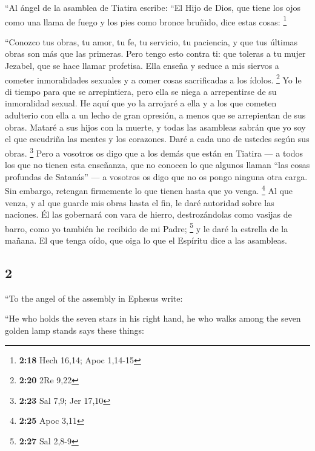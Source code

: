 \begin{paracol}{2}
 ``Al ángel de la asamblea de Tiatira escribe: ``El Hijo
de Dios, que tiene los ojos como una llama de fuego y los pies como
bronce bruñido, dice estas cosas: \footnote{\textbf{2:18} Hech 16,14;
  Apoc 1,14-15}

 ``Conozco tus obras, tu amor, tu fe, tu servicio, tu
paciencia, y que tus últimas obras son más que las primeras.
 Pero tengo esto contra ti: que toleras a tu mujer
Jezabel, que se hace llamar profetisa. Ella enseña y seduce a mis
siervos a cometer inmoralidades sexuales y a comer cosas sacrificadas a
los ídolos. \footnote{\textbf{2:20} 2Re 9,22}  Yo le di
tiempo para que se arrepintiera, pero ella se niega a arrepentirse de su
inmoralidad sexual.  He aquí que yo la arrojaré a ella y
a los que cometen adulterio con ella a un lecho de gran opresión, a
menos que se arrepientan de sus obras.  Mataré a sus
hijos con la muerte, y todas las asambleas sabrán que yo soy el que
escudriña las mentes y los corazones. Daré a cada uno de ustedes según
sus obras. \footnote{\textbf{2:23} Sal 7,9; Jer 17,10} 
Pero a vosotros os digo que a los demás que están en Tiatira --- a todos
los que no tienen esta enseñanza, que no conocen lo que algunos llaman
``las cosas profundas de Satanás'' --- a vosotros os digo que no os
pongo ninguna otra carga.  Sin embargo, retengan
firmemente lo que tienen hasta que yo venga. \footnote{\textbf{2:25}
  Apoc 3,11}  Al que venza, y al que guarde mis obras
hasta el fin, le daré autoridad sobre las naciones.  Él
las gobernará con vara de hierro, destrozándolas como vasijas de barro,
como yo también he recibido de mi Padre; \footnote{\textbf{2:27} Sal
  2,8-9}  y le daré la estrella de la mañana.
 El que tenga oído, que oiga lo que el Espíritu dice a
las asambleas.

\switchcolumn
\begin{otherlanguage}{english}

\hypertarget{section-3}{%
\section{2}\label{section-3}}

 ``To the angel of the assembly in Ephesus write:

``He who holds the seven stars in his right hand, he who walks among the
seven golden lamp stands says these things:


\end{otherlanguage}
\end{paracol}
